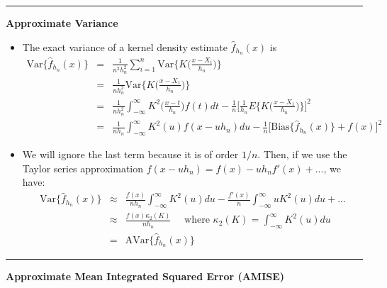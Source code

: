 \documentclass[]{book}
\begin{document}
\begin{center}\rule{0.5\linewidth}{\linethickness}\end{center}

\textbf{Approximate Variance}

\begin{itemize}
\item
  The exact variance of a kernel density estimate \(\hat{f}_{h_{n}}(x)\) is
  \begin{eqnarray}
  \textrm{Var}\{ \hat{f}_{h_{n}}(x) \}
  &=& \frac{1}{n^{2}h_{n}^{2}} \sum_{i=1}^{n} \textrm{Var}\Big\{  K\Big( \frac{x - X_{i}}{ h_{n} } \Big) \Big\} \nonumber \\
  &=& \frac{1}{nh_{n}^{2}} \textrm{Var}\Big\{  K\Big( \frac{x - X_{1}}{ h_{n} } \Big) \Big\} \nonumber \\
  &=& \frac{1}{n h_{n}^{2} }\int_{-\infty}^{\infty} K^{2}\Big( \frac{x - t}{h_{n}} \Big) f(t) dt - \frac{1}{n}\Big[ \frac{1}{h_{n}}E\Big\{  K\Big( \frac{x - X_{1}}{ h_{n} } \Big) \Big\} \Big]^{2}  \nonumber \\
  &=& \frac{1}{n h_{n} }\int_{-\infty}^{\infty} K^{2}(u) f(x - uh_{n}) du - \frac{1}{n}\Big[ \textrm{Bias}\{ \hat{f}_{h_{n}}(x) \} + f(x) \Big]^{2} \nonumber
  \end{eqnarray}
\item
  We will ignore the last term because it is of order \(1/n\). Then, if we use the Taylor series approximation
  \(f(x - uh_{n}) = f(x) - uh_{n}f'(x) + ...\), we have:
  \begin{eqnarray}
  \textrm{Var}\{ \hat{f}_{h_{n}}(x) \}
  &\approx& \frac{f(x)}{n h_{n} }\int_{-\infty}^{\infty} K^{2}(u) du - \frac{f'(x)}{n}\int_{-\infty}^{\infty} u K^{2}(u) du  +  ... \nonumber \\
  &\approx& \frac{f(x)\kappa_{2}(K) }{n h_{n} } \quad \textrm{ where } \kappa_{2}(K) = \int_{-\infty}^{\infty} K^{2}( u ) du \nonumber \\
  &=& \textrm{AVar}\{ \hat{f}_{h_{n}}(x) \}  \nonumber
  \end{eqnarray}
\end{itemize}

\begin{center}\rule{0.5\linewidth}{\linethickness}\end{center}

\textbf{Approximate Mean Integrated Squared Error (AMISE)}
\end{document}
